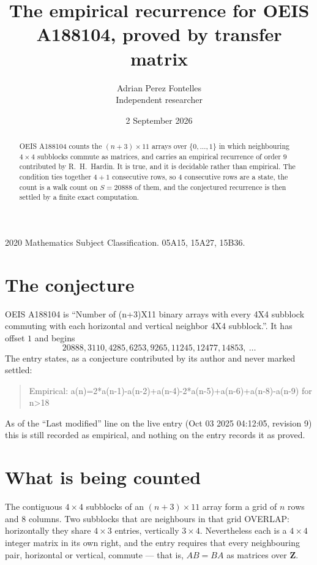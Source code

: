 \documentclass[11pt,a4paper]{article}
\title{The empirical recurrence for OEIS A188104, proved by transfer matrix}
\author{Adrian Perez Fontelles\\ \small Independent researcher}
\date{2 September 2026}
\theoremstyle{plain}
\theoremstyle{definition}
\begin{document}
\maketitle

\begin{abstract}
OEIS A188104 counts the $(n+3)\times11$ arrays over $\{0,\dots,1\}$ in which
neighbouring $4\times4$ subblocks commute as matrices, and carries an empirical
recurrence
of order $9$ contributed by R.~H.~Hardin. It is true, and it is decidable rather than
empirical. The condition ties together $4+1$ consecutive rows, so $4$ consecutive rows are
a state, the count is a walk count on $S=20888$ of them, and the conjectured recurrence is then
settled by a finite exact computation.
\end{abstract}

\noindent\small 2020 Mathematics Subject Classification. 05A15, 15A27, 15B36.\normalsize

\section{The conjecture}

OEIS A188104 is ``Number of (n+3)X11 binary arrays with every 4X4 subblock commuting with each horizontal and vertical neighbor 4X4 subblock.''. It has offset $1$ and begins
\[
20888, 3110, 4285, 6253, 9265, 11245, 12477, 14853,\ \dots
\]
The entry states, as a conjecture contributed by its author and never marked settled:
\begin{quote}
Empirical: a(n)=2*a(n-1)-a(n-2)+a(n-4)-2*a(n-5)+a(n-6)+a(n-8)-a(n-9) for n>18
\end{quote}
As of the ``Last modified'' line on the live entry (Oct 03 2025 04:12:05, revision 9) this is still
recorded as empirical, and nothing on the entry records it as proved.

\section{What is being counted}

The contiguous $4\times4$ subblocks of an $(n+3)\times11$ array form a grid of $n$
rows and $8$ columns. Two subblocks that are neighbours in that
grid OVERLAP: horizontally they share $4\times3$ entries, vertically
$3\times4$. Nevertheless each is a $4\times4$ integer matrix in its own right, and
the entry requires that every neighbouring pair, horizontal or vertical, commute --- that is,
$AB=BA$ as matrices over $\mathbf{Z}$.
\end{document}
